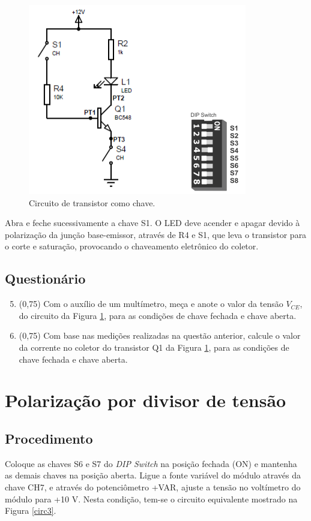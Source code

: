 \documentclass[11pt]{article}
\begin{document}
\begin{figure}[!htb]
\centering
\includegraphics[width=.4\textwidth]{Chave.png}
\caption{Circuito de transistor como chave.}
\label{circ2}
\end{figure}

Abra e feche sucessivamente a chave S1. O LED deve acender e apagar devido à polarização da junção base-emissor, através de R4 e S1, que leva o transistor para o corte e saturação, provocando o chaveamento eletrônico do coletor.

\subsection*{Questionário}

\begin{enumerate}
\setcounter{enumi}{4}

\item (0,75) Com o auxílio de um multímetro, meça e anote o valor da tensão $V_{CE}$, do circuito da Figura \ref{circ2}, para as condições de chave fechada e chave aberta.

\item (0,75) Com base nas medições realizadas na questão anterior, calcule o valor da corrente no coletor do transistor Q1 da Figura \ref{circ2}, para as condições de chave fechada e chave aberta.

\end{enumerate}

\section*{Polarização por divisor de tensão}

\subsection*{Procedimento}

Coloque as chaves S6 e S7 do \textit{DIP Switch} na posição fechada (ON) e mantenha as demais chaves na posição aberta. Ligue a fonte variável do módulo através da chave CH7, e através do potenciômetro +VAR, ajuste a tensão no voltímetro do módulo para +10 V. Nesta condição, tem-se o circuito equivalente mostrado na Figura \ref{circ3}.
\end{document}
